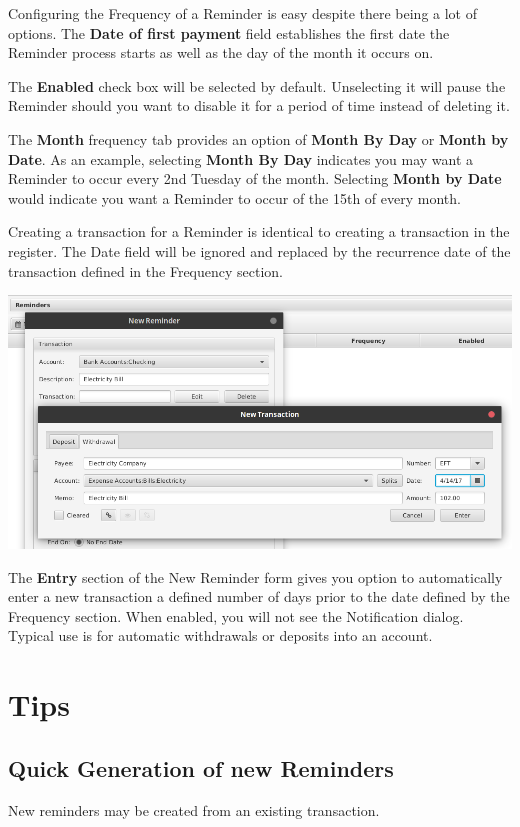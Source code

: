 \documentclass[letterpaper,12pt]{book}
\begin{document}
    Configuring the Frequency of a Reminder is easy despite there being a lot of options. The \textbf{Date of first payment}
    field establishes the first date the Reminder process starts as well as the day of the month it occurs on.

    The \textbf{Enabled} check box will be selected by default. Unselecting it will pause the Reminder should you want
    to disable it for a period of time instead of deleting it.

    The \textbf{Month} frequency tab provides an option of \textbf{Month By Day} or \textbf{Month by Date}.
    As an example, selecting \textbf{Month By Day} indicates you may want a Reminder to occur every 2nd Tuesday of the month.
    Selecting \textbf{Month by Date} would indicate you want a Reminder to occur of the 15th of every month.

    Creating a transaction for a Reminder is identical to creating a transaction in the register. The Date field will be
    ignored and replaced by the recurrence date of the transaction defined in the Frequency section.

    \includegraphics[width=0.85\linewidth]{images/remindersNewTransaction}

    The \textbf{Entry} section of the New Reminder form gives you option to automatically enter a new transaction a defined number
    of days prior to the date defined by the Frequency section. When enabled, you will not see the Notification dialog.
    Typical use is for automatic withdrawals or deposits into an account.

    \section{Tips}

    \subsection{Quick Generation of new Reminders}
    New reminders may be created from an existing transaction.
\end{document}
